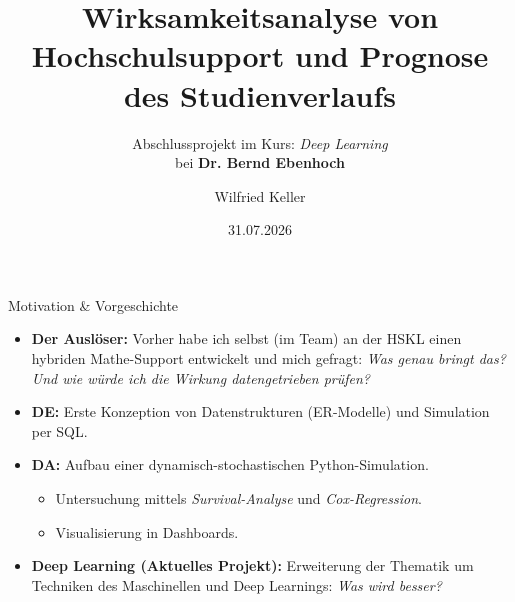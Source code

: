 \documentclass[12pt]{beamer}
\begin{document}
	\author{Wilfried Keller}
	\title[DeepSurvival \& Support]{Wirksamkeitsanalyse von Hochschulsupport und Prognose des Studienverlaufs}
	\subtitle{Abschlussprojekt im Kurs: \emph{Deep Learning}\\ bei \textbf{Dr. Bernd Ebenhoch}}
	\date{31.07.2026}
	\subject{DeepLearning}

\begin{frame}[plain]
	\maketitle
\end{frame}

\begin{frame}{Motivation \& Vorgeschichte}
    \begin{itemize}
        \item \textbf{Der Auslöser:} Vorher habe ich selbst (im Team) an der HSKL einen hybriden Mathe-Support entwickelt und mich gefragt: \emph{Was genau bringt das? Und wie würde ich die Wirkung \emph{datengetrieben} prüfen?}
        \item \textbf{DE:} Erste Konzeption von Datenstrukturen (ER-Modelle) und Simulation per SQL.
        \item \textbf{DA:} Aufbau einer dynamisch-stochastischen Python-Simulation.
        \begin{itemize}
            \item Untersuchung mittels \textit{Survival-Analyse} und \textit{Cox-Regression}.
            \item Visualisierung in Dashboards.
        \end{itemize}
        \item \textbf{Deep Learning (Aktuelles Projekt):} Erweiterung der Thematik um Techniken des Maschinellen und Deep Learnings: \emph{Was wird besser?}
    \end{itemize}
\end{frame}
\end{document}
